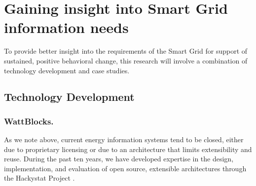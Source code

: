 
\section{Gaining insight into Smart Grid information needs}
\label{sec:methodology}

To provide better insight into the requirements of the Smart Grid for
support of sustained, positive behavioral change, this research will
involve a combination of  technology development and case studies.

\subsection{Technology Development}

\subsubsection{WattBlocks.}

As we note above, current energy information systems tend to be closed,
either due to proprietary licensing or due to an architecture that limits
extensibility and reuse.  During the past ten years, we have developed
expertise in the design, implementation, and evaluation of open source,
extensible architectures through the Hackystat Project
\cite{csdl2-06-06,csdl2-09-02,csdl2-09-07,csdl2-09-01}.


